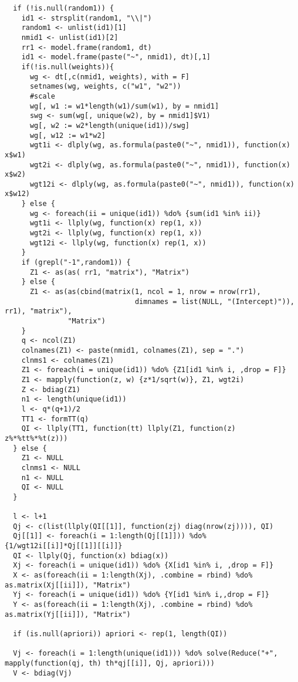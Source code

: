 \documentclass[12pt,a4paper]{article}
\begin{document}
\begin{appendix}
\begin{footnotesize}
\begin{verbatim}
  if (!is.null(random1)) {
    id1 <- strsplit(random1, "\\|")
    random1 <- unlist(id1)[1]
    nmid1 <- unlist(id1)[2]
    rr1 <- model.frame(random1, dt)
    id1 <- model.frame(paste("~", nmid1), dt)[,1]
    if(!is.null(weights)){
      wg <- dt[,c(nmid1, weights), with = F]
      setnames(wg, weights, c("w1", "w2"))
      #scale
      wg[, w1 := w1*length(w1)/sum(w1), by = nmid1]
      swg <- sum(wg[, unique(w2), by = nmid1]$V1)
      wg[, w2 := w2*length(unique(id1))/swg]
      wg[, w12 := w1*w2]
      wgt1i <- dlply(wg, as.formula(paste0("~", nmid1)), function(x) x$w1)
      wgt2i <- dlply(wg, as.formula(paste0("~", nmid1)), function(x) x$w2)
      wgt12i <- dlply(wg, as.formula(paste0("~", nmid1)), function(x) x$w12)
    } else {
      wg <- foreach(ii = unique(id1)) %do% {sum(id1 %in% ii)}
      wgt1i <- llply(wg, function(x) rep(1, x))
      wgt2i <- llply(wg, function(x) rep(1, x))
      wgt12i <- llply(wg, function(x) rep(1, x))
    }
    if (grepl("-1",random1)) {
      Z1 <- as(as( rr1, "matrix"), "Matrix")
    } else {
      Z1 <- as(as(cbind(matrix(1, ncol = 1, nrow = nrow(rr1),
                               dimnames = list(NULL, "(Intercept)")), rr1), "matrix"),
               "Matrix")
    }
    q <- ncol(Z1)
    colnames(Z1) <- paste(nmid1, colnames(Z1), sep = ".")
    clnms1 <- colnames(Z1)
    Z1 <- foreach(i = unique(id1)) %do% {Z1[id1 %in% i, ,drop = F]}
    Z1 <- mapply(function(z, w) {z*1/sqrt(w)}, Z1, wgt2i)
    Z <- bdiag(Z1)
    n1 <- length(unique(id1))
    l <- q*(q+1)/2
    TT1 <- formTT(q)
    QI <- llply(TT1, function(tt) llply(Z1, function(z) z%*%tt%*%t(z)))
  } else {
    Z1 <- NULL
    clnms1 <- NULL
    n1 <- NULL
    QI <- NULL
  }
  
  l <- l+1
  Qj <- c(list(llply(QI[[1]], function(zj) diag(nrow(zj)))), QI)
  Qj[[1]] <- foreach(i = 1:length(Qj[[1]])) %do% {1/wgt12i[[i]]*Qj[[1]][[i]]}
  QI <- llply(Qj, function(x) bdiag(x))
  Xj <- foreach(i = unique(id1)) %do% {X[id1 %in% i, ,drop = F]}
  X <- as(foreach(ii = 1:length(Xj), .combine = rbind) %do% as.matrix(Xj[[ii]]), "Matrix")
  Yj <- foreach(i = unique(id1)) %do% {Y[id1 %in% i,,drop = F]}
  Y <- as(foreach(ii = 1:length(Xj), .combine = rbind) %do% as.matrix(Yj[[ii]]), "Matrix")
  
  if (is.null(apriori)) apriori <- rep(1, length(QI))
  
  Vj <- foreach(i = 1:length(unique(id1))) %do% solve(Reduce("+", mapply(function(qj, th) th*qj[[i]], Qj, apriori)))
  V <- bdiag(Vj)
  

\end{verbatim}
\end{footnotesize}
\end{appendix}
\end{document}
